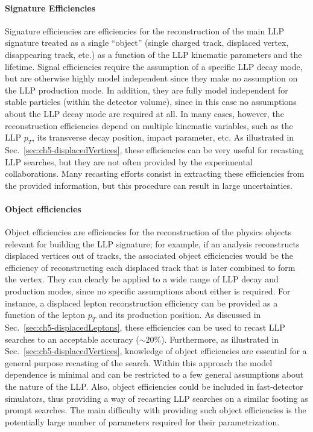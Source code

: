 \paragraph{Signature Efficiencies} Signature efficiencies are efficiencies for the reconstruction of the
main LLP signature treated as a single ``object'' (single charged track, displaced vertex, disappearing
track, etc.) as a function of the LLP kinematic parameters and
the lifetime. 
Signal efficiencies require the assumption of a specific LLP decay mode, but 
are otherwise highly model independent since they make no assumption on the LLP
production mode.
In addition, they are fully model independent for stable particles
(within the detector volume), since in this case no assumptions about
the LLP decay mode are required at all.
In many cases, however, the reconstruction efficiencies depend on multiple
kinematic variables, such as the LLP $p_T$, its transverse decay position, impact
parameter, etc. 
As illustrated in Sec.~\ref{sec:ch5-displacedVertices}, these efficiencies
can be very useful for recasting LLP searches, but  they 
are not often provided by the experimental collaborations. Many recasting efforts consist in 
extracting these efficiencies from the provided information, but
this procedure can result in large uncertainties. 

\paragraph{Object efficiencies} Object efficiencies are efficiencies for the reconstruction of
the physics objects relevant for building the LLP signature; for example, if an analysis
reconstructs displaced vertices out of tracks, the associated object efficiencies would be
the efficiency of reconstructing each displaced track that is later combined to form the vertex.
They can clearly be applied to a wide range of LLP
decay and production modes, since no specific assumptions about either is
required. 
For instance, a displaced lepton reconstruction efficiency can be provided
as a function of the lepton $p_T$ and its production position.
As discussed in Sec.~\ref{sec:ch5-displacedLeptons}, these efficiencies
can be used to recast LLP searches to an acceptable accuracy ($\sim 20\%$).
Furthermore, as illustrated in Sec.~\ref{sec:ch5-displacedVertices},
knowledge of object efficiencies are essential for a general purpose
recasting of the search.
Within this approach the model dependence is minimal and can be
restricted to a few general assumptions about the nature of the LLP.
Also, object efficiencies could be included in fast-detector simulators, thus providing a way of recasting LLP searches
on a similar footing as prompt searches. 
The main difficulty with providing such object efficiencies is
the potentially large number of parameters required for their parametrization.

